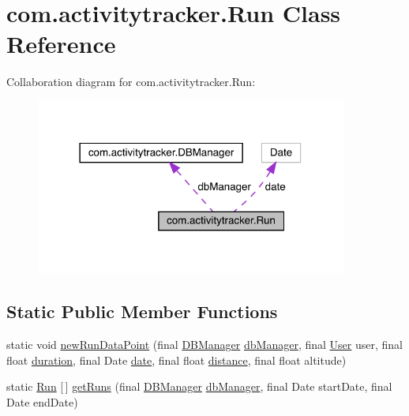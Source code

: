 \hypertarget{classcom_1_1activitytracker_1_1_run}{}\section{com.\+activitytracker.\+Run Class Reference}
\label{classcom_1_1activitytracker_1_1_run}


Collaboration diagram for com.\+activitytracker.\+Run\+:
\nopagebreak
\begin{figure}[H]
\begin{center}
\leavevmode
\includegraphics[width=290pt]{classcom_1_1activitytracker_1_1_run__coll__graph}
\end{center}
\end{figure}
\subsection*{Static Public Member Functions}
\begin{DoxyCompactItemize}
\item 
static void \mbox{\hyperlink{classcom_1_1activitytracker_1_1_run_a5dea6f1860431103d553ce770382afe0}{new\+Run\+Data\+Point}} (final \mbox{\hyperlink{classcom_1_1activitytracker_1_1_d_b_manager}{D\+B\+Manager}} \mbox{\hyperlink{classcom_1_1activitytracker_1_1_run_ab90e32eda9f4c671ae3575f971edca6b}{db\+Manager}}, final \mbox{\hyperlink{classcom_1_1activitytracker_1_1_user}{User}} user, final float \mbox{\hyperlink{classcom_1_1activitytracker_1_1_run_a5e38d293d29d4b65c9290ff4bee82e03}{duration}}, final Date \mbox{\hyperlink{classcom_1_1activitytracker_1_1_run_a66934b1f4fe6bc74a4e98574a2892764}{date}}, final float \mbox{\hyperlink{classcom_1_1activitytracker_1_1_run_a7b4ca8c4ecea4da1653f03b8c8fc16a8}{distance}}, final float altitude)
\item 
static \mbox{\hyperlink{classcom_1_1activitytracker_1_1_run}{Run}} \mbox{[}$\,$\mbox{]} \mbox{\hyperlink{classcom_1_1activitytracker_1_1_run_a238cc6c056460ead34475961a7c9a00c}{get\+Runs}} (final \mbox{\hyperlink{classcom_1_1activitytracker_1_1_d_b_manager}{D\+B\+Manager}} \mbox{\hyperlink{classcom_1_1activitytracker_1_1_run_ab90e32eda9f4c671ae3575f971edca6b}{db\+Manager}}, final Date start\+Date, final Date end\+Date)
\end{DoxyCompactItemize}
